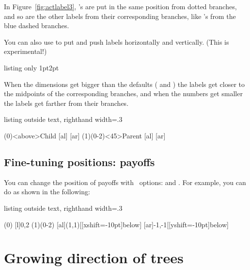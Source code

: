 In Figure~\ref{fig:actlabel3}, 's are put in the same position from dotted branches,
and so are the other labels from their corresponding branches, like 's from the blue dashed branches.

You can also use \icmd{\xtALShift} to put and push labels horizontally and vertically. (This is experimental!)

\begin{tcblisting}{listing only}
  {1pt}{2pt}
\end{tcblisting}

When the dimensions get bigger than the defaults (\xw{1pt} and \xw{2pt}) the labels get closer to the midpoints of the corresponding branches, and when the numbers get smaller the labels get farther from their branches.

\begin{tcblisting}{listing outside text, righthand width=.3\linewidth}
\begin{istgame}
\xtALShift{4pt}{3pt}
\istroot(0)<above>{Child} %
  [al]  [ar]  \endist
\istroot(1)(0-2)<45>{Parent}
  [al]  [ar]  \endist
\end{istgame}
\end{tcblisting}


\subsection{Fine-tuning positions: payoffs}

You can change the position of payoffs with \TikZ\ options:  and .
For example, you can do as shown in the following:
\label{page:finetuningpayoffs}

\begin{tcblisting}{listing outside text, righthand width=.3\linewidth}
\begin{istgame}
\istroot(0)
  [l]{0,2}    \endist
\istroot(1)(0-2)
  \istb{\alpha}[al]{(1,1)}[[xshift=-10pt]below]
  \istb{\beta}[ar]{-1,-1}[[yshift=-10pt]below]
  \endist
\end{istgame}
\end{tcblisting}


\section{Growing direction of trees}
\label{sec:growing}

